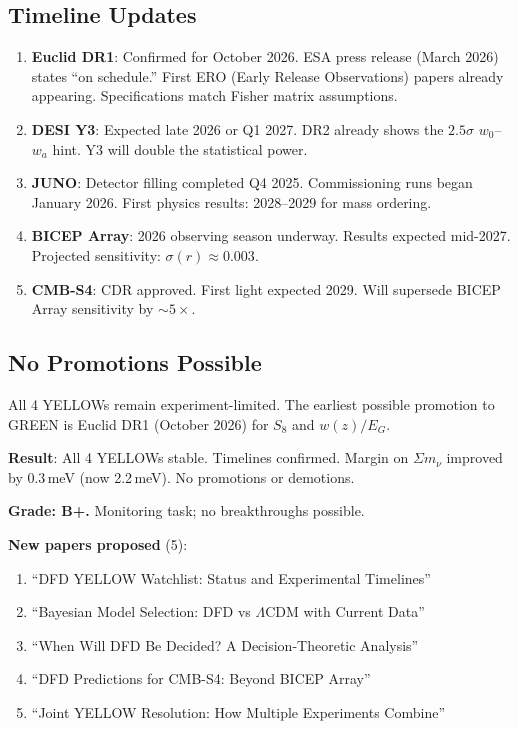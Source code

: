 \documentclass[11pt,a4paper]{article}
\begin{document}
\subsection{Timeline Updates}

\begin{enumerate}
\item \textbf{Euclid DR1}: Confirmed for October 2026. ESA press release (March 2026) states ``on schedule.'' First ERO (Early Release Observations) papers already appearing. Specifications match Fisher matrix assumptions.
\item \textbf{DESI Y3}: Expected late 2026 or Q1 2027. DR2 already shows the $2.5\sigma$ $w_0$--$w_a$ hint. Y3 will double the statistical power.
\item \textbf{JUNO}: Detector filling completed Q4 2025. Commissioning runs began January 2026. First physics results: 2028--2029 for mass ordering.
\item \textbf{BICEP Array}: 2026 observing season underway. Results expected mid-2027. Projected sensitivity: $\sigma(r) \approx 0.003$.
\item \textbf{CMB-S4}: CDR approved. First light expected 2029. Will supersede BICEP Array sensitivity by $\sim 5\times$.
\end{enumerate}

\subsection{No Promotions Possible}

All 4 YELLOWs remain experiment-limited. The earliest possible promotion to GREEN is Euclid DR1 (October 2026) for $S_8$ and $w(z)/E_G$.

\begin{tcolorbox}[colback=yellow!5!white, colframe=yellow!60!black, title={Agent 9: YELLOW Monitoring --- No Changes}]
\textbf{Result}: All 4 YELLOWs stable. Timelines confirmed. Margin on $\Sigma m_\nu$ improved by 0.3\,meV (now 2.2\,meV). No promotions or demotions.

\textbf{Grade: B+.} Monitoring task; no breakthroughs possible.

\textbf{New papers proposed} (5):
\begin{enumerate}
\item ``DFD YELLOW Watchlist: Status and Experimental Timelines''
\item ``Bayesian Model Selection: DFD vs $\Lambda$CDM with Current Data''
\item ``When Will DFD Be Decided? A Decision-Theoretic Analysis''
\item ``DFD Predictions for CMB-S4: Beyond BICEP Array''
\item ``Joint YELLOW Resolution: How Multiple Experiments Combine''
\end{enumerate}
\end{tcolorbox}
\end{document}

